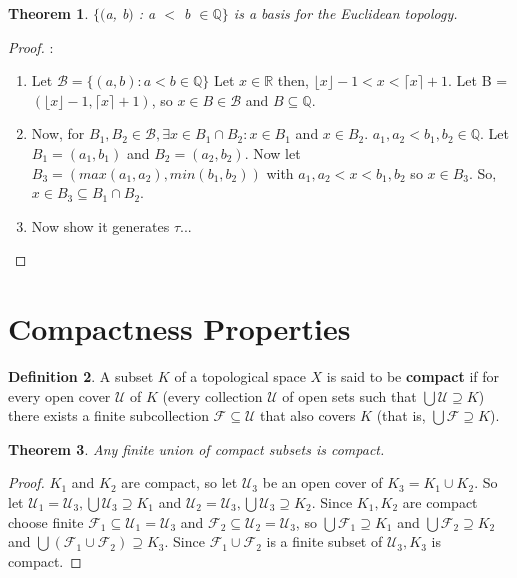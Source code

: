 \documentclass{amsart}
\theoremstyle{plain}
\newtheorem{theorem}{Theorem}
\theoremstyle{definition}
\newtheorem{definition}[theorem]{Definition}
\theoremstyle{remark}
\begin{document}
	\begin{theorem}
	$\lbrace($a, b$)$ : a $<$ b $\in \mathbb{Q}\rbrace$ is a basis for the Euclidean topology.
	\end{theorem}
	\begin{proof}:\newline
		\begin{enumerate}
		\item Let $\mathcal{B} = \lbrace (a, b) : a < b \in \mathbb{Q}\rbrace$ Let $x \in \mathbb{R}$ then, $\lfloor x \rfloor -1 < x < \lceil x \rceil + 1$. Let B = $(\lfloor x \rfloor -1, \lceil x \rceil + 1)$, so $x \in B \in \mathcal{B}$ and $B \subseteq \mathbb{Q}$.
		\item Now, for $B_1, B_2 \in \mathcal{B}, \exists x \in B_1 \cap B_2 : x \in B_1$ and $x \in B_2$. $a_1, a_2 < b_1, b_2 \in \mathbb{Q}.$ Let $B_1 = (a_1, b_1)$ and $B_2 = (a_2, b_2)$. Now let $B_3 = (max(a_1,a_2), min(b_1,b_2))$ with $a_1,a_2<x<b_1,b_2$ so $x \in B_3$. So, $x \in B_3 \subseteq B_1 \cap B_2$.
		\item Now show it generates $\tau$...
		\end{enumerate} 
	\end{proof}

\section{Compactness Properties}

	\begin{definition}
	  A subset \(K\) of a topological space \(X\) is said to be \textbf{compact} if for every
	  open cover \(\mathcal U\) of \(K\) (every collection \(\mathcal U\) of open sets
	  such that \(\bigcup \mathcal U\supseteq K\)) there exists a finite subcollection
	  \(\mathcal F\subseteq \mathcal U\) that also covers \(K\) (that is,
	  \(\bigcup\mathcal F\supseteq K\)).
	\end{definition}

	\begin{theorem}
	  Any finite union of compact subsets is compact.
	\end{theorem}

	\begin{proof}
	$K_1$ and $K_2$ are compact, so let $\mathcal{U}_3$ be an open cover of $K_3 = K_1 \cup K_2$. So let $\mathcal{U}_1 = \mathcal{U}_3, \bigcup \mathcal{U}_3 \supseteq K_1$ and $\mathcal{U}_2 = \mathcal{U}_3, \bigcup \mathcal{U}_3 \supseteq K_2$. Since $K_1, K_2$ are compact choose finite $\mathcal{F}_1 \subseteq \mathcal{U}_1 = \mathcal{U}_3$ and $\mathcal{F}_2 \subseteq \mathcal{U}_2 = \mathcal{U}_3$, so $\bigcup \mathcal{F}_1 \supseteq K_1$ and $\bigcup \mathcal{F}_2 \supseteq K_2$ and $\bigcup (\mathcal{F}_1 \cup \mathcal{F}_2) \supseteq K_3$. Since $\mathcal{F}_1 \cup \mathcal{F}_2$ is a finite subset of $\mathcal{U}_3, K_3$ is compact.
	\end{proof}
\end{document}
